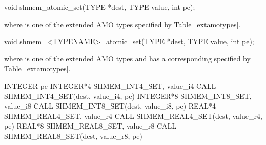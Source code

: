 
\begin{apidefinition}

\begin{C11synopsis}
void shmem_atomic_set(TYPE *dest, TYPE value, int pe);
\end{C11synopsis}
where \TYPE{} is one of the extended \ac{AMO} types specified by
Table~\ref{extamotypes}.

\begin{Csynopsis}
void shmem_<TYPENAME>_atomic_set(TYPE *dest, TYPE value, int pe);
\end{Csynopsis}
where \TYPE{} is one of the extended \ac{AMO} types and has a corresponding
\TYPENAME{} specified by Table~\ref{extamotypes}.

\begin{DeprecateBlock}
\begin{Fsynopsis}
INTEGER pe
INTEGER*4 SHMEM_INT4_SET, value_i4
CALL SHMEM_INT4_SET(dest, value_i4, pe)
INTEGER*8 SHMEM_INT8_SET, value_i8
CALL SHMEM_INT8_SET(dest, value_i8, pe)
REAL*4 SHMEM_REAL4_SET, value_r4
CALL SHMEM_REAL4_SET(dest, value_r4, pe)
REAL*8 SHMEM_REAL8_SET, value_r8
CALL SHMEM_REAL8_SET(dest, value_r8, pe)
\end{Fsynopsis}
\end{DeprecateBlock}

\begin{apiarguments}


\end{apiarguments}




\end{apidefinition}
